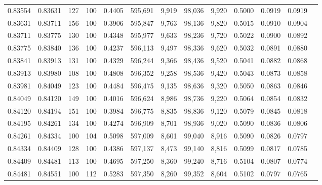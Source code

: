 \begin{tabular}{rrrrrrrrrrrrr}
0.83554 & 0.83631 &   127 & 100 &                                     0.4405 & 595,691 &   9,919 &  98,036 &   9,920 & 0.5000 & 0.0919 & 0.0919 \\
0.83631 & 0.83711 &   156 & 100 &                                     0.3906 & 595,847 &   9,763 &  98,136 &   9,820 & 0.5015 & 0.0910 & 0.0904 \\
0.83711 & 0.83775 &   130 & 100 &                                     0.4348 & 595,977 &   9,633 &  98,236 &   9,720 & 0.5022 & 0.0900 & 0.0892 \\
0.83775 & 0.83840 &   136 & 100 &                                     0.4237 & 596,113 &   9,497 &  98,336 &   9,620 & 0.5032 & 0.0891 & 0.0880 \\
0.83841 & 0.83913 &   131 & 100 &                                     0.4329 & 596,244 &   9,366 &  98,436 &   9,520 & 0.5041 & 0.0882 & 0.0868 \\
0.83913 & 0.83980 &   108 & 100 &                                     0.4808 & 596,352 &   9,258 &  98,536 &   9,420 & 0.5043 & 0.0873 & 0.0858 \\
0.83981 & 0.84049 &   123 & 100 &                                     0.4484 & 596,475 &   9,135 &  98,636 &   9,320 & 0.5050 & 0.0863 & 0.0846 \\
0.84049 & 0.84120 &   149 & 100 &                                     0.4016 & 596,624 &   8,986 &  98,736 &   9,220 & 0.5064 & 0.0854 & 0.0832 \\
0.84120 & 0.84194 &   151 & 100 &                                     0.3984 & 596,775 &   8,835 &  98,836 &   9,120 & 0.5079 & 0.0845 & 0.0818 \\
0.84195 & 0.84261 &   134 & 100 &                                     0.4274 & 596,909 &   8,701 &  98,936 &   9,020 & 0.5090 & 0.0836 & 0.0806 \\
0.84261 & 0.84334 &   100 & 104 &                                     0.5098 & 597,009 &   8,601 &  99,040 &   8,916 & 0.5090 & 0.0826 & 0.0797 \\
0.84334 & 0.84409 &   128 & 100 &                                     0.4386 & 597,137 &   8,473 &  99,140 &   8,816 & 0.5099 & 0.0817 & 0.0785 \\
0.84409 & 0.84481 &   113 & 100 &                                     0.4695 & 597,250 &   8,360 &  99,240 &   8,716 & 0.5104 & 0.0807 & 0.0774 \\
0.84481 & 0.84551 &   100 & 112 &                                     0.5283 & 597,350 &   8,260 &  99,352 &   8,604 & 0.5102 & 0.0797 & 0.0765 \\

\end{tabular}
